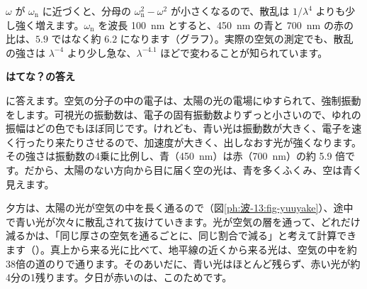 \begin{seikaku}
$\omega$ が $\omega_{\mathrm n}$ に近づくと、分母の $\omega_{\mathrm n}^2-\omega^2$ が小さくなるので、散乱は $1/\lambda^4$ よりも少し強く増えます。$\omega_{\mathrm n}$ を波長 \qty{100}{nm} とすると、\qty{450}{nm} の青と \qty{700}{nm} の赤の比は、$5.9$ ではなく約 $6.2$ になります（グラフ）。実際の空気の測定でも、散乱の強さは $\lambda^{-4}$ より少し急な、$\lambda^{-4.1}$ ほどで変わることが知られています。
\par\vspace{2pt}\centering
{}
\end{seikaku}

\noindent\textbf{はてな？の答え}\par\nobreak
\label{ph:波-13:hatena}\bkhatenaref に答えます。空気の分子の中の電子は、太陽の光の電場にゆすられて、強制振動をします。可視光の振動数は、電子の固有振動数よりずっと小さいので、ゆれの振幅はどの色でもほぼ同じです。けれども、青い光は振動数が大きく、電子を速く行ったり来たりさせるので、加速度が大きく、出しなおす光が強くなります。その強さは振動数の4乗に比例し、青（\qty{450}{nm}）は赤（\qty{700}{nm}）の約 5.9 倍です。だから、太陽のない方向から目に届く空の光は、青を多くふくみ、空は青く見えます。

夕方は、太陽の光が空気の中を長く通るので（図\ref{ph:波-13:fig-yuuyake}）、途中で青い光が次々に散乱されて抜けていきます。光が空気の層を通って、どれだけ減るかは、「同じ厚さの空気を通るごとに、同じ割合で減る」と考えて計算できます（\nobreak{}\nobreak）。真上から来る光に比べて、地平線の近くから来る光は、空気の中を約38倍の道のりで通ります。そのあいだに、青い光はほとんど残らず、赤い光が約4分の1残ります。夕日が赤いのは、このためです。

